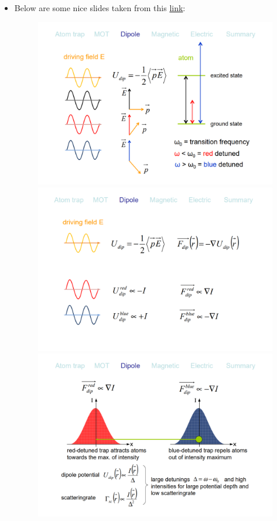 \documentclass{book}
\theoremstyle{definition}
\begin{document}
\begin{itemize}
\begin{itemize}
	
	\item Below are some nice slides taken from this \href{https://www.mpq.mpg.de/5020867/0515b_atom_traps.pdf}{link}:
	\begin{figure}[!htb]
		\centering
		\includegraphics[scale=0.3]{slide1}
		\includegraphics[scale=0.3]{slide2}
		\includegraphics[scale=0.3]{slide3}

\end{figure}
\end{itemize}
\end{itemize}
\end{document}
